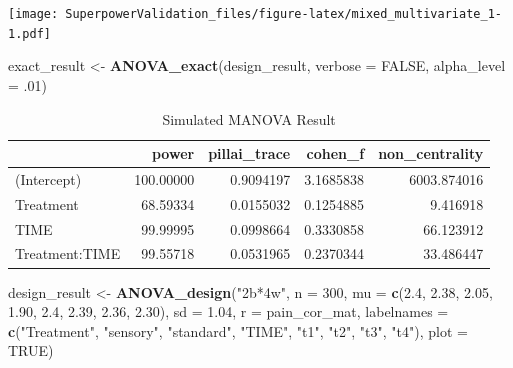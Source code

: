 \documentclass[]{book}
\newenvironment{Shaded}{\begin{snugshade}}{\end{snugshade}}
\newcommand{\DataTypeTok}[1]{\textcolor[rgb]{0.13,0.29,0.53}{#1}}
\newcommand{\DecValTok}[1]{\textcolor[rgb]{0.00,0.00,0.81}{#1}}
\newcommand{\FloatTok}[1]{\textcolor[rgb]{0.00,0.00,0.81}{#1}}
\newcommand{\KeywordTok}[1]{\textcolor[rgb]{0.13,0.29,0.53}{\textbf{#1}}}
\newcommand{\NormalTok}[1]{#1}
\newcommand{\OtherTok}[1]{\textcolor[rgb]{0.56,0.35,0.01}{#1}}
\newcommand{\StringTok}[1]{\textcolor[rgb]{0.31,0.60,0.02}{#1}}
\begin{document}
\texttt{[image: SuperpowerValidation\_files/figure-latex/mixed\_multivariate\_1-1.pdf]}

\begin{Shaded}
\begin{Highlighting}[]
\NormalTok{exact_result <-}\StringTok{ }\KeywordTok{ANOVA_exact}\NormalTok{(design_result, }\DataTypeTok{verbose =} \OtherTok{FALSE}\NormalTok{,}
                            \DataTypeTok{alpha_level =} \FloatTok{.01}\NormalTok{)}
\end{Highlighting}
\end{Shaded}

\begin{table}[!h]

\caption{\label{tab:unnamed-chunk-203}Simulated MANOVA Result}
\centering
\begin{tabular}{l|r|r|r|r}
\hline
  & power & pillai\_trace & cohen\_f & non\_centrality\\
\hline
(Intercept) & 100.00000 & 0.9094197 & 3.1685838 & 6003.874016\\
\hline
Treatment & 68.59334 & 0.0155032 & 0.1254885 & 9.416918\\
\hline
TIME & 99.99995 & 0.0998664 & 0.3330858 & 66.123912\\
\hline
Treatment:TIME & 99.55718 & 0.0531965 & 0.2370344 & 33.486447\\
\hline
\end{tabular}
\end{table}

\begin{Shaded}
\begin{Highlighting}[]
\NormalTok{design_result <-}\StringTok{ }\KeywordTok{ANOVA_design}\NormalTok{(}\StringTok{"2b*4w"}\NormalTok{,}
                              \DataTypeTok{n =} \DecValTok{300}\NormalTok{,}
                              \DataTypeTok{mu =} \KeywordTok{c}\NormalTok{(}\FloatTok{2.4}\NormalTok{, }\FloatTok{2.38}\NormalTok{, }\FloatTok{2.05}\NormalTok{, }\FloatTok{1.90}\NormalTok{,}
                                     \FloatTok{2.4}\NormalTok{, }\FloatTok{2.39}\NormalTok{, }\FloatTok{2.36}\NormalTok{, }\FloatTok{2.30}\NormalTok{),}
                              \DataTypeTok{sd =} \FloatTok{1.04}\NormalTok{,}
                              \DataTypeTok{r =}\NormalTok{ pain_cor_mat,}
                              \DataTypeTok{labelnames =} \KeywordTok{c}\NormalTok{(}\StringTok{"Treatment"}\NormalTok{, }\StringTok{"sensory"}\NormalTok{, }\StringTok{"standard"}\NormalTok{,}
                                             \StringTok{"TIME"}\NormalTok{, }\StringTok{"t1"}\NormalTok{, }\StringTok{"t2"}\NormalTok{, }\StringTok{"t3"}\NormalTok{, }\StringTok{"t4"}\NormalTok{),}
                              \DataTypeTok{plot =} \OtherTok{TRUE}\NormalTok{)}
\end{Highlighting}
\end{Shaded}
\end{document}
